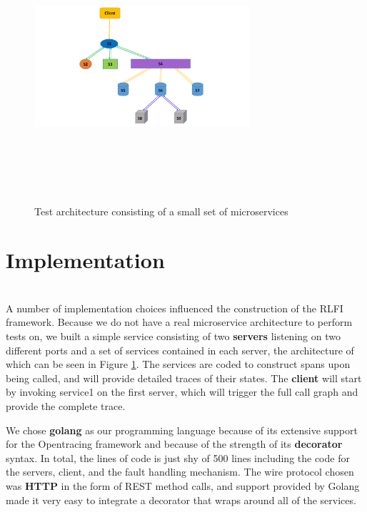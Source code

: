 

\begin{figure}
\centering
\includegraphics[width=8cm,height=10cm,keepaspectratio=true]{toy_architecture}
\caption{Test architecture consisting of a small set of microservices}
\label{toy_arch}
\end{figure}


\section{Implementation} \label{implementation}
\\
A number of implementation choices influenced the construction of the RLFI framework. Because we do not have a real microservice architecture to perform tests on, we built a simple service consisting of two \textbf{servers} listening on two different ports and a set of services contained in each server, the architecture of which can be seen in Figure \ref{toy_arch}. The services are coded to construct spans upon being called, and will provide detailed traces of their states. The \textbf{client} will start by invoking service1 on the first server, which will trigger the full call graph and provide the complete trace.

We chose \textbf{golang}\cite{google:golang} as our programming language because of its extensive support for the Opentracing framework and because of the strength of its \textbf{decorator} syntax. In total, the lines of code is just shy of 500 lines including the code for the servers, client, and the fault handling mechanism. The wire protocol chosen was \textbf{HTTP} in the form of REST method calls, and support provided by Golang made it very easy to integrate a decorator that wraps around all of the services. 


